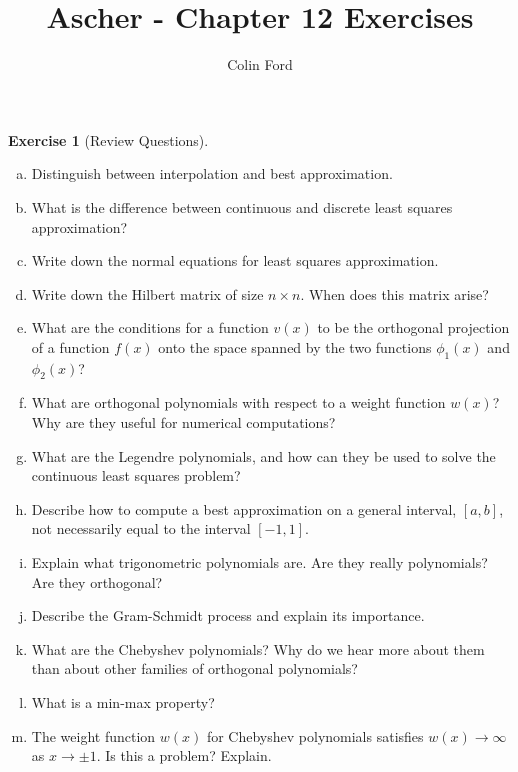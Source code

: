 \documentclass[12pt,a4]{article}
\author{Colin Ford}
\title{Ascher - Chapter 12 Exercises}
\date{}
\theoremstyle{definition}
\newtheorem{exercise}{Exercise}
\begin{document}
\maketitle

\begin{exercise}[Review Questions]
	\begin{enumerate}[(a)]
		\item Distinguish between interpolation and best approximation.
		
		\item What is the difference between continuous and discrete least squares approximation?
		
		\item Write down the normal equations for least squares approximation.
	
		\item Write down the Hilbert matrix of size $n \times n$. When does this matrix arise?
		
		\item What are the conditions for a function $v(x)$ to be the orthogonal projection of a function $f(x)$ onto the space spanned by the two functions $\phi_1(x)$ and $\phi_2(x)$?
		
		\item What are orthogonal polynomials with respect to a weight function $w(x)$? Why are they useful for numerical computations?
		
		\item What are the Legendre polynomials, and how can they be used to solve the continuous least squares problem?
		
		\item Describe how to compute a best approximation on a general interval, $[a, b]$, not necessarily equal to the interval $[-1, 1]$.
		
		\item Explain what trigonometric polynomials are. Are they really polynomials? Are they orthogonal?
		
		\item Describe the Gram-Schmidt process and explain its importance.
		
		\item What are the Chebyshev polynomials? Why do we hear more about them than about other families of orthogonal polynomials?
		
		\item What is a min-max property?
		
		\item The weight function $w(x)$ for Chebyshev polynomials satisfies $w(x) \to \infty$ as $x \to \pm 1$. Is this a problem? Explain.
		
	\end{enumerate}
\end{exercise}
\end{document}
